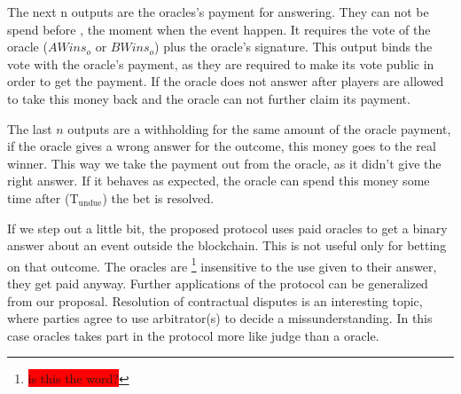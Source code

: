 The next n outputs are the oracles's payment for answering.
They can not be spend before , the moment when the event happen.
It requires the vote of the oracle ($AWins_o$ or $BWins_o$) plus the oracle's
   signature.
This output binds the vote with the oracle's payment, as they are required to
  make its vote public in order to get the payment.
If the oracle does not answer after  players are allowed to
  take this money back and the oracle can not further claim its payment.

The last $n$ outputs are a withholding for the same amount of the oracle
  payment, if the oracle gives a wrong answer for the outcome, this money
  goes to the real winner.
This way we take the payment out from the oracle, as it didn't give the right
  answer.
If it behaves as expected, the oracle can spend this money some time after
  (T$_{\text{undue}}$) the bet is resolved.

If we step out a little bit, the proposed protocol uses paid oracles to get a
  binary answer about an event outside the blockchain. This is not useful only
  for betting on that outcome. The oracles are \footnote{\colorbox{red}{
  is this the word?}} insensitive to the use given to their answer, they get
  paid anyway. Further applications of the protocol can be generalized from our
  proposal.
Resolution of contractual disputes is an interesting topic, where parties agree
  to use arbitrator(s) to decide a missunderstanding.
In this case oracles takes part in the protocol more like judge than a oracle.

